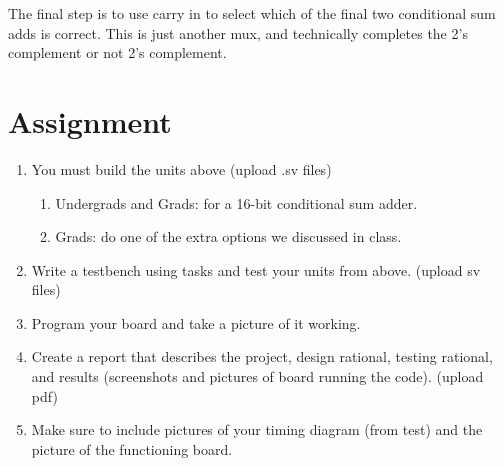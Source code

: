 The final step is to use carry in to select which of the final two conditional sum adds is correct. This is
just another mux, and technically completes the 2's complement or not 2's complement.

\section{Assignment}



\begin{enumerate}
\item You must build the units above (upload .sv files)
   \begin{enumerate}
   \item Undergrads and Grads: for a 16-bit conditional sum adder.
   \item Grads: do one of the extra options we discussed in class.
   \end{enumerate}
\item Write a testbench using tasks and test your units from above. (upload sv files)
\item Program your board and take a picture of it working.
\item  Create a report that describes the project, design rational, testing rational, and results (screenshots and pictures of board running the code). (upload pdf)
\item Make sure to include pictures of your timing diagram (from test) and the picture of the functioning board.
\end{enumerate} 